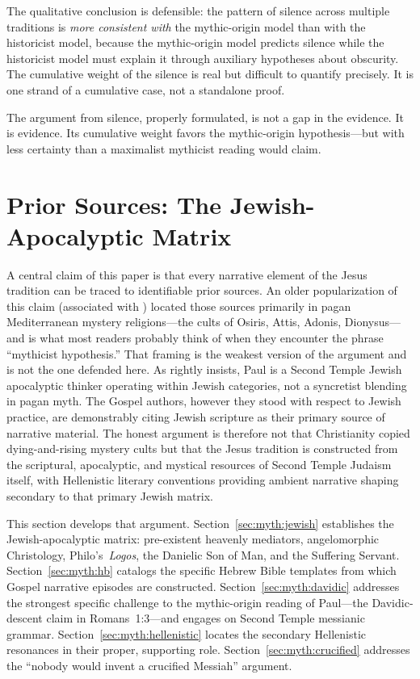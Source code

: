 \documentclass[12pt,oneside]{article}
\begin{document}
The qualitative conclusion is defensible: the pattern of silence across
multiple traditions is \textit{more consistent with} the mythic-origin
model than with the historicist model, because the mythic-origin model
predicts silence while the historicist model must explain it through
auxiliary hypotheses about obscurity.  The cumulative weight of the
silence is real but difficult to quantify precisely.  It is one strand
of a cumulative case, not a standalone proof.

The argument from silence, properly formulated, is not a gap in the
evidence.  It is evidence.  Its cumulative weight favors the
mythic-origin hypothesis---but with less certainty than a maximalist
mythicist reading would claim.


\section{Prior Sources: The Jewish-Apocalyptic Matrix}
\label{sec:myth}

A central claim of this paper is that every narrative element of the
Jesus tradition can be traced to identifiable prior sources.  An older
popularization of this claim (associated with \citet{Frazer1890}) located
those sources primarily in pagan Mediterranean mystery religions---the
cults of Osiris, Attis, Adonis, Dionysus---and is what most readers
probably think of when they encounter the phrase ``mythicist hypothesis.''
That framing is the weakest version of the argument and is not the one
defended here.  As \citet{Fredriksen2017,Fredriksen2018} rightly
insists, Paul is a Second Temple Jewish apocalyptic thinker operating
within Jewish categories, not a syncretist blending in pagan myth.  The
Gospel authors, however they stood with respect to Jewish practice, are
demonstrably citing Jewish scripture as their primary source of
narrative material.  The honest argument is therefore not that
Christianity copied dying-and-rising mystery cults but that the Jesus
tradition is constructed from the scriptural, apocalyptic, and
mystical resources of Second Temple Judaism itself, with Hellenistic
literary conventions providing ambient narrative shaping secondary to
that primary Jewish matrix.

This section develops that argument.
Section~\ref{sec:myth:jewish} establishes the Jewish-apocalyptic matrix:
pre-existent heavenly mediators, angelomorphic Christology,
Philo's~\textit{Logos}, the Danielic Son of Man, and the Suffering
Servant.  Section~\ref{sec:myth:hb} catalogs the specific Hebrew Bible
templates from which Gospel narrative episodes are constructed.
Section~\ref{sec:myth:davidic} addresses the strongest specific
challenge to the mythic-origin reading of Paul---the Davidic-descent
claim in Romans~1:3---and engages \citet{Novenson2017} on Second Temple
messianic grammar.  Section~\ref{sec:myth:hellenistic} locates the
secondary Hellenistic resonances in their proper, supporting role.
Section~\ref{sec:myth:crucified} addresses the ``nobody would invent a
crucified Messiah'' argument.
\end{document}
